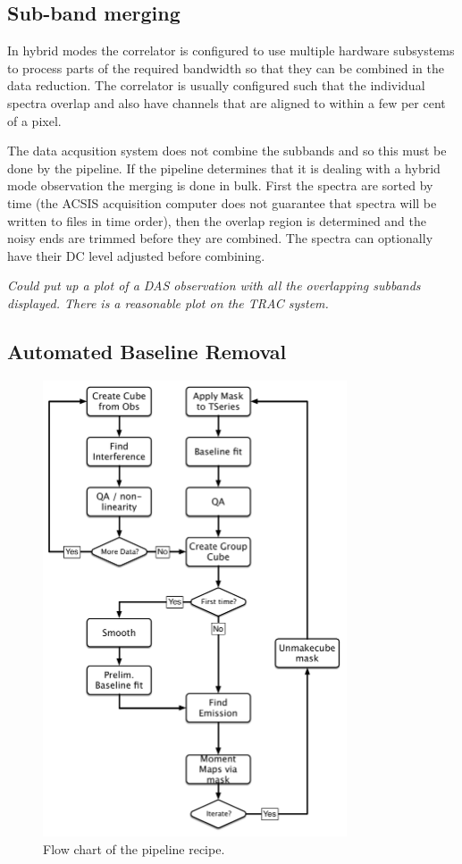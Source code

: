 \documentclass[final,authoryear,5p,times,twocolumn]{elsarticle}
\begin{document}
\subsection{Sub-band merging}

In hybrid modes the correlator is configured to use multiple
hardware subsystems to process parts of the required bandwidth so
that they can be combined in the data reduction. The correlator is
usually configured such that the individual spectra overlap and also
have channels that are aligned to within a few per cent of a pixel.

The data acqusition system does not combine the subbands and so this
must be done by the pipeline. If the pipeline determines that it is
dealing with a hybrid mode observation the merging is done in
bulk. First the spectra are sorted by time (the ACSIS acquisition
computer does not guarantee that spectra will be written to files in
time order), then the overlap region is determined and the noisy ends
are trimmed before they are combined. The spectra can optionally have
their DC level adjusted before combining.

\textit{Could put up a plot of a DAS observation with all the
  overlapping subbands displayed. There is a reasonable plot on the
  TRAC system.}

\subsection{Automated Baseline Removal}

\begin{figure}
\includegraphics[width=90mm]{flowchart}
\caption{Flow chart of the pipeline recipe.}
\label{fig:flowchart}
\end{figure}
\end{document}
